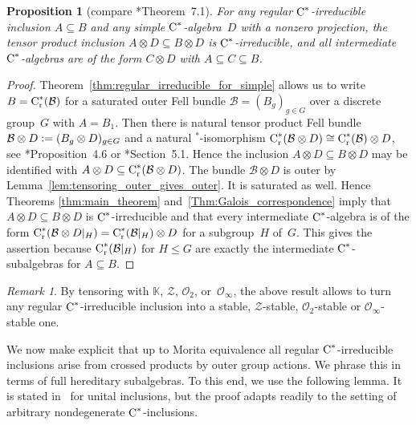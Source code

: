 \documentclass[a4paper]{amsart}
\theoremstyle{plain}
\newtheorem{proposition}[theorem]{Proposition}
\theoremstyle{definition}
\theoremstyle{remark}
\newtheorem{remark}[theorem]{Remark}
\numberwithin{theorem}{section}
\numberwithin{equation}{section}
\newcommand*{\nb}{\nobreakdash}
\newcommand*{\Star}{\(^*\)\nobreakdash-}
\newcommand*{\Comp}{\mathbb K}%
\newcommand*{\red}{\mathrm{r}}%
\newcommand*{\Cst}{\textup C^*}%
\newcommand*{\B}{\mathcal B}%
\newcommand*{\defeq}{\mathrel{\vcentcolon=}}%
\begin{document}
\begin{proposition}[compare \cite{Rordam:Irreducible_inclusions}*{Theorem~7.1}]
  For any regular \(\Cst\)\nb-irreducible inclusion \(A\subseteq B\)
  and any simple \(\Cst\)\nb-algebra~\(D\) with a nonzero projection,
  the tensor product inclusion \(A\otimes D\subseteq B\otimes D\) is
  \(\Cst\)\nb-irreducible, and all intermediate \(\Cst\)\nb-algebras
  are of the form \(C\otimes D\) with \(A\subseteq C\subseteq B\).
\end{proposition}

\begin{proof}
  Theorem~\ref{thm:regular_irreducible_for_simple} allows us to write
  \(B=\Cst_\red(\B)\) for a saturated outer Fell bundle
  \(\B=(B_g)_{g\in G}\) over a discrete group~\(G\)  with \(A=B_1\).
  Then there is natural tensor product Fell bundle \(\B\otimes D\defeq
  (B_g\otimes D)_{g\in G}\) and a natural \Star{}isomorphism
  \(\Cst_\red(\B\otimes D)\cong \Cst_\red(\B)\otimes D\), see
  \cite{Abadie:Tensor}*{Proposition~4.6} or
  \cite{Buss-Martinez:Approximation_Fell}*{Section~5.1}.
  Hence the inclusion \(A\otimes D\subseteq B\otimes D\) may be identified with
  \(A\otimes D\subseteq \Cst_\red(\B\otimes D)\).
  The bundle \(\B\otimes D\) is outer by
  Lemma~\ref{lem:tensoring_outer_gives_outer}.
  It is saturated as well.
  Hence Theorems \ref{thm:main_theorem}
  and~\ref{Thm:Galois_correspondence} imply that \(A\otimes D\subseteq
  B\otimes D\) is \(\Cst\)\nb-irreducible and that every intermediate
  \(\Cst\)\nb-algebra is of the form \(\Cst_\red(\B\otimes
  D|_H)=\Cst_\red(\B|_H)\otimes D\) for a subgroup~\(H\) of~\(G\).
  This gives the assertion because  \(\Cst_\red(\B|_H)\) for \(H\le
  G\) are exactly the intermediate \(\Cst\)\nb-subalgebras for
  \(A\subseteq B\).
\end{proof}

\begin{remark}
By tensoring  with \(\Comp\),  \(\mathcal{Z}\), \(\mathcal{O}_2\),
  or~\(\mathcal{O}_\infty\),
  the above result allows  to turn any regular
  \(\Cst\)\nb-irreducible inclusion into a stable, \(\mathcal{Z}\)-stable,
  \(\mathcal{O}_2\)-stable or \(\mathcal{O}_\infty\)-stable one.
\end{remark}

We now make explicit that up to Morita equivalence all regular
\(\Cst\)\nb-irreducible inclusions arise from crossed products by
outer group actions.
We phrase this in terms of full hereditary subalgebras.
To this end, we use the following lemma.
It is stated in~\cite{Echterhoff-Rordam:Inclusions} for unital
inclusions, but the proof adapts readily to the setting of arbitrary
nondegenerate \(\Cst\)\nb-inclusions.
\end{document}
